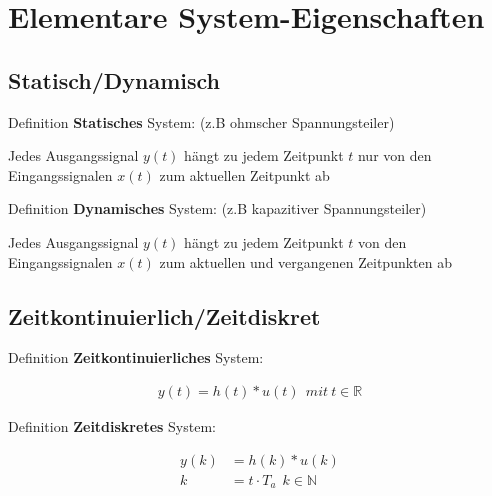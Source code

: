 \documentclass[10pt,a4paper]{article}
\begin{document}
\twocolumn
\pagestyle{fancy}
\section{Elementare System-Eigenschaften}
  \subsection{Statisch/Dynamisch}
  Definition \textbf{Statisches} System: (z.B ohmscher Spannungsteiler)
  \begin{mdframed}[style=exercise]
      Jedes Ausgangssignal $y(t)$ hängt zu jedem Zeitpunkt $t$ nur von den Eingangssignalen $x(t)$ zum aktuellen Zeitpunkt ab
  \end{mdframed}
  Definition \textbf{Dynamisches} System: (z.B kapazitiver Spannungsteiler)
  \begin{mdframed}[style=exercise]
      Jedes Ausgangssignal $y(t)$ hängt zu jedem Zeitpunkt $t$ von den Eingangssignalen $x(t)$ zum aktuellen und vergangenen Zeitpunkten ab
  \end{mdframed}
  \subsection{Zeitkontinuierlich/Zeitdiskret}
  Definition \textbf{Zeitkontinuierliches} System:
  \begin{mdframed}[style=exercise]
    \begin{align}
      y(t)=h(t)*u(t) \ \ mit \ t \in \mathbb{R}
    \end{align}
  \end{mdframed}
  Definition \textbf{Zeitdiskretes} System:
  \begin{mdframed}[style=exercise]
    \begin{align}
        y(k) &=h(k)*u(k) \\  
        k &= t\cdot T_a  \ \ k \in \mathbb{N}
    \end{align}
  \end{mdframed}
\end{document}
